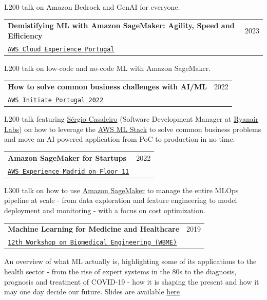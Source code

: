 \documentclass[letterpaper,11pt]{article}
\makeatletter
\newcommand{\resumeSubheading}[4]{
  \vspace{-2pt}\item
    \begin{tabular*}{0.97\textwidth}[t]{l@{\extracolsep{\fill}}r}
      \textbf{#1} & #2 \\
      \texttt{\small#3} & \textit{\small #4} \\
    \end{tabular*}\vspace{-7pt}
}
\makeatother
\begin{document}
    L200 talk on Amazon Bedrock and GenAI for everyone.
    
    \vspace{2mm}
    \resumeSubheading
      {Demistifying ML with Amazon SageMaker: Agility, Speed and Efficiency}{2023}
      {\href{https://aws.amazon.com/events/cloud-experience-portugal}{AWS Cloud Experience Portugal}}{}
    \vspace{3mm}

    L200 talk on low-code and no-code ML with Amazon SageMaker.
    
    \vspace{2mm}
    \resumeSubheading
      {How to solve common business challenges with AI/ML}{2022}
      {\href{https://pages.awscloud.com/InitiatePortugal_2022.html}{AWS Initiate Portugal 2022}}{}
    \vspace{3mm}

    L200 talk featuring \href{https://www.linkedin.com/in/sergiocasaleiro/}{Sérgio Casaleiro} (Software Development Manager at \href{https://careers.ryanair.com/ryanair-labs-dublin/}{Ryanair Labs}) on how to leverage the \href{https://docs.aws.amazon.com/whitepapers/latest/aws-overview/machine-learning.html}{AWS ML Stack} to solve common business problems and move an AI-powered application from PoC to production in no time.
    
    \vspace{2mm}
    \resumeSubheading
      {Amazon SageMaker for Startups}{2022}
      {\href{https://aws-experience.com/emea/madrid}{AWS Experience Madrid on Floor 11}}{}
    \vspace{3mm}

    L300 talk on how to use \href{https://aws.amazon.com/sagemaker/}{Amazon SageMaker} to manage the entire MLOps pipeline at scale - from data exploration and feature engineering to model deployment and monitoring - with a focus on cost optimization.
    
    \vspace{2mm}
    \resumeSubheading
      {Machine Learning for Medicine and Healthcare}{2019}
      {\href{http://wbme.fc.ul.pt/}{12th Workshop on Biomedical Engineering (WBME)}}{}
    \vspace{3mm}

    An overview of what ML actually is, highlighting some of its applications to the health sector - from the rise of expert systems in the 80s to the diagnosis, prognosis and treatment of COVID-19 - how it is shaping the present and how it may one day decide our future. Slides are available \href{https://github.com/JGalego/WBME-ML-Workshop}{here}
    
\end{document}

